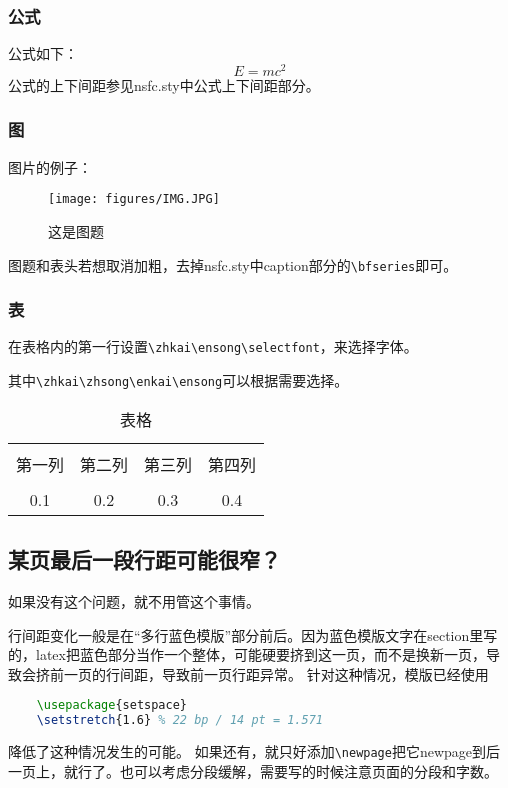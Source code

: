 \subsubsection{公式}

公式如下：
\begin{equation}
	E=mc^2
\end{equation}
公式的上下间距参见nsfc.sty中公式上下间距部分。

\subsubsection{图}
图片的例子：
\begin{figure}[h!]
\centering %
\texttt{[image: figures/IMG.JPG]}
\captionsetup{justification=centering} %
\caption{这是图题}
\end{figure}

图题和表头若想取消加粗，去掉nsfc.sty中caption部分的\verb|\bfseries|即可。


\subsubsection{表}
在表格内的第一行设置\verb|\zhkai\ensong\selectfont|，来选择字体。

其中\verb|\zhkai\zhsong\enkai\ensong|可以根据需要选择。
\begin{table}[htbp]
	\zhkai\ensong\selectfont%
	\centering  %
	\caption{表格}  %
	\label{table1}  %
	\begin{tabular}{|c|c|c|c|}  
		\hline  %
		& & & \\[-6pt]  %
		第一列&第二列&第三列&第四列 \\  %
		\hline
		& & & \\[-6pt]  %
		0.1&0.2&0.3&0.4 \\
		\hline
	\end{tabular}
\end{table}

\subsection{某页最后一段行距可能很窄？}
如果没有这个问题，就不用管这个事情。

行间距变化一般是在“多行蓝色模版”部分前后。因为蓝色模版文字在section里写的，latex把蓝色部分当作一个整体，可能硬要挤到这一页，而不是换新一页，导致会挤前一页的行间距，导致前一页行距异常。
针对这种情况，模版已经使用
\begin{lstlisting}[language=tex, basicstyle=\ttfamily\small, keywordstyle=\color{blue}, commentstyle=\color{gray}]
	%自动段落的行间距微调
	\usepackage{setspace}
	\setstretch{1.6} % 22 bp / 14 pt = 1.571
\end{lstlisting}
降低了这种情况发生的可能。
如果还有，就只好添加\verb|\newpage|把它newpage到后一页上，就行了。也可以考虑分段缓解，需要写的时候注意页面的分段和字数。

